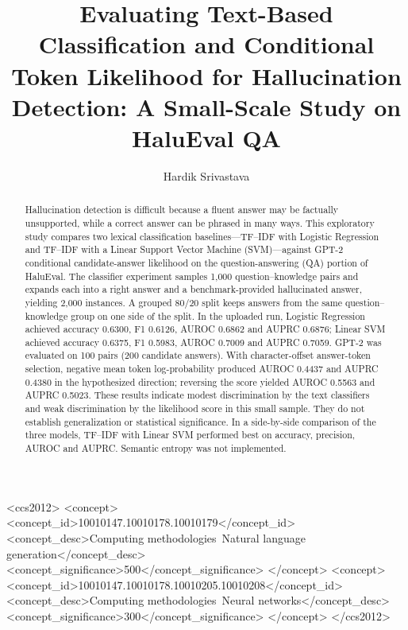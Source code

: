 \documentclass[acmsmall,nonacm]{acmart}
\title{Evaluating Text-Based Classification and Conditional Token Likelihood for Hallucination Detection: A Small-Scale Study on HaluEval QA}
\author{Hardik Srivastava}
\affiliation{%
  \institution{Dual Degree M.Tech--PhD, Information Technology (Robotics and AI), Indian Institute of Information Technology Allahabad}
  \city{Prayagraj}
  \country{India}
}
\begin{document}
\begin{abstract}
Hallucination detection is difficult because a fluent answer may be factually unsupported, while a correct answer can be phrased in many ways. This exploratory study compares two lexical classification baselines---TF--IDF with Logistic Regression and TF--IDF with a Linear Support Vector Machine (SVM)---against GPT-2 conditional candidate-answer likelihood on the question-answering (QA) portion of HaluEval. The classifier experiment samples 1,000 question--knowledge pairs and expands each into a right answer and a benchmark-provided hallucinated answer, yielding 2,000 instances. A grouped 80/20 split keeps answers from the same question--knowledge group on one side of the split. In the uploaded run, Logistic Regression achieved accuracy 0.6300, F1 0.6126, AUROC 0.6862 and AUPRC 0.6876; Linear SVM achieved accuracy 0.6375, F1 0.5983, AUROC 0.7009 and AUPRC 0.7059. GPT-2 was evaluated on 100 pairs (200 candidate answers). With character-offset answer-token selection, negative mean token log-probability produced AUROC 0.4437 and AUPRC 0.4380 in the hypothesized direction; reversing the score yielded AUROC 0.5563 and AUPRC 0.5023. These results indicate modest discrimination by the text classifiers and weak discrimination by the likelihood score in this small sample. They do not establish generalization or statistical significance. In a side-by-side comparison of the three models, TF--IDF with Linear SVM performed best on accuracy, precision, AUROC and AUPRC. Semantic entropy was not implemented.
\end{abstract}

\begin{CCSXML}
<ccs2012>
   <concept>
       <concept_id>10010147.10010178.10010179</concept_id>
       <concept_desc>Computing methodologies~Natural language generation</concept_desc>
       <concept_significance>500</concept_significance>
   </concept>
   <concept>
       <concept_id>10010147.10010178.10010205.10010208</concept_id>
       <concept_desc>Computing methodologies~Neural networks</concept_desc>
       <concept_significance>300</concept_significance>
   </concept>
</ccs2012>
\end{CCSXML}


\end{document}
